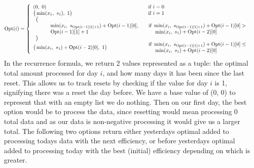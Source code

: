\documentclass[12pt]{article}
\begin{document}
$$
	\text{Opt}(i) =
	\left\{
	\begin{array}{ll}
		(0,\ 0)                       & \hspace*{1.5mm}\text{if } i = 0  \\
		\big(\min(x_1,\ s_1),\ 1\big) & \hspace*{1.5mm} \text{if } i = 1 \\
		\begin{array}{l}
			\big(                                                                     \\
			\hspace*{10mm} \min(x_i,\ s_{\text{Opt}(i-1)[1]+1} )+ \text{Opt}(i-1)[0], \\
			\hspace*{10mm} {\text{Opt}(i-1)[1]+1}                                     \\
			\big)
		\end{array}
		                              & \begin{array}{l}
			\text{if } \min(x_i,\ s_{\text{Opt}(i-1)[1]+1}) + \text{Opt}(i-1)[0] > \\
			\hspace*{4.5mm}\min(x_i,\ s_{1}) + \text{Opt}(i-2)[0]
		\end{array}        \\
		\big(\min(x_i,\ s_{1} )+ \text{Opt}(i-2)[0],\ 1 \big)
		                              & \begin{array}{l}
			\text{if } \min(x_i,\ s_{\text{Opt}(i-1)[1]+1}) + \text{Opt}(i-1)[0] \leq \\
			\hspace*{4.5mm}\min(x_i,\ s_{1}) + \text{Opt}(i-2)[0]
		\end{array}        \\
	\end{array}
	\right.
$$
In the recurrence formula, we return 2 values represented as a tuple: the optimal total amount processed for day $i$,
and how many days it has been since the last reset. This allows us to track resets by checking if the value for day $i$ is 1,
signifying there was a reset the day before. We have a base value of (0, 0) to represent that with an empty list we do nothing.
Then on our first day, the best option would be to process the data, since resetting would mean processing 0
total data and as our data is non-negative processing it would give us a larger total. The following two options return either
yesterdays optimal added to processing todays data with the next efficiency, or before yesterdays optimal added to processing
today with the best (initial) efficiency depending on which is greater.
\end{document}
